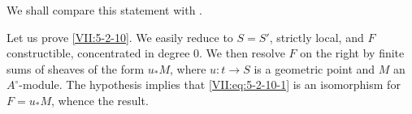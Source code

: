 We shall compare this statement with \cite[XV 1.17]{sga4}.

Let us prove \ref{VII:5-2-10}. We easily reduce to $S=S'$,
strictly local, and $F$ constructible, concentrated in degree $0$. We
then resolve $F$ on the right by finite sums of sheaves of the form
$u_\ast M$, where $u:t\to S$ is a geometric point and $M$ an
$A^\circ$-module. The hypothesis implies that \eqref{VII:eq:5-2-10-1} is an
isomorphism for $F=u_\ast M$, whence the result.
